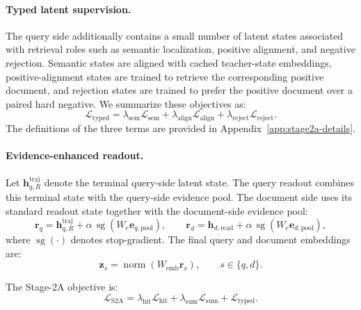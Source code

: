 \paragraph{Typed latent supervision.}
The query side additionally contains a small number of latent states associated with retrieval roles such as semantic localization, positive alignment, and negative rejection. Semantic states are aligned with cached teacher-state embeddings, positive-alignment states are trained to retrieve the corresponding positive document, and rejection states are trained to prefer the positive document over a paired hard negative. We summarize these objectives as:
\begin{equation}
    \mathcal{L}_{\mathrm{typed}}
    =
    \lambda_{\mathrm{sem}}
    \mathcal{L}_{\mathrm{sem}}
    +
    \lambda_{\mathrm{align}}
    \mathcal{L}_{\mathrm{align}}
    +
    \lambda_{\mathrm{reject}}
    \mathcal{L}_{\mathrm{reject}}.
\label{eq:stage2a-typed-loss}
\end{equation}
The definitions of the three terms are provided in Appendix~\ref{app:stage2a-details}.

\paragraph{Evidence-enhanced readout.}
Let $\mathbf{h}_{q,R}^{\mathrm{traj}}$ denote the terminal query-side latent state. The query readout combines this terminal state with the query-side evidence pool. The document side uses its standard readout state together with the document-side evidence pool:
\begin{equation}
    \mathbf{r}_q
    =
    \mathbf{h}_{q,R}^{\mathrm{traj}}
    +
    \alpha\,
    \operatorname{sg}
    \left(
        W_e
        \mathbf{e}_{q,\mathrm{pool}}
    \right),
    \qquad
    \mathbf{r}_d
    =
    \mathbf{h}_{d,\mathrm{read}}
    +
    \alpha\,
    \operatorname{sg}
    \left(
        W_e
        \mathbf{e}_{d,\mathrm{pool}}
    \right),
\label{eq:stage2a-readout}
\end{equation}
where $\operatorname{sg}(\cdot)$ denotes stop-gradient. The final query and document embeddings are:
\begin{equation}
    \mathbf{z}_s
    =
    \operatorname{norm}
    \left(
        W_{\mathrm{emb}}
        \mathbf{r}_s
    \right),
    \qquad
    s\in\{q,d\}.
\label{eq:stage2a-embedding}
\end{equation}

The Stage-2A objective is:
\begin{equation}
    \mathcal{L}_{\mathrm{S2A}}
    =
    \lambda_{\mathrm{hit}}
    \mathcal{L}_{\mathrm{hit}}
    +
    \lambda_{\mathrm{sum}}
    \mathcal{L}_{\mathrm{sum}}
    +
    \mathcal{L}_{\mathrm{typed}}.
\label{eq:stage2a-objective}
\end{equation}

